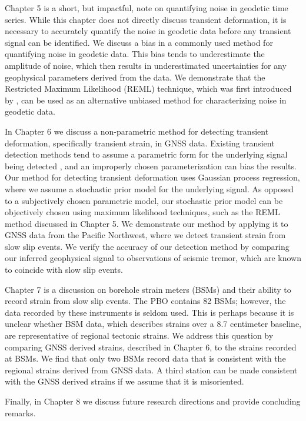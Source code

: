 Chapter 5 is a short, but impactful, note on quantifying noise in geodetic time series.  While this chapter does not directly discuss transient deformation, it is necessary to accurately quantify the noise in geodetic data before any transient signal can be identified. We discuss a bias in a commonly used method for quantifying noise in geodetic data. This bias tends to underestimate the amplitude of noise, which then results in underestimated uncertainties for any geophysical parameters derived from the data. We demonstrate that the Restricted Maximum Likelihood (REML) technique, which was first introduced by \citet{Patterson1971}, can be used as an alternative unbiased method for characterizing noise in geodetic data.

In Chapter 6 we discuss a non-parametric method for detecting transient deformation, specifically transient strain, in GNSS data. Existing transient detection methods tend to assume a parametric form for the underlying signal being detected \citep[e.g.,][]{Ohtani2010}, and an improperly chosen parameterization can bias the results. Our method for detecting transient deformation uses Gaussian process regression, where we assume a stochastic prior model for the underlying signal. As opposed to a subjectively chosen parametric model, our stochastic prior model can be objectively chosen using maximum likelihood techniques, such as the REML method discussed in Chapter 5. We demonstrate our method by applying it to GNSS data from the Pacific Northwest, where we detect transient strain from slow slip events. We verify the accuracy of our detection method by comparing our inferred geophysical signal to observations of seismic tremor, which are known to coincide with slow slip events.       

Chapter 7 is a discussion on borehole strain meters (BSMs) and their ability to record strain from slow slip events. The PBO contains 82 BSMs; however, the data recorded by these instruments is seldom used. This is perhaps because it is unclear whether BSM data, which describes strains over a 8.7 centimeter baseline, are representative of regional tectonic strains. We address this question by comparing GNSS derived strains, described in Chapter 6, to the strains recorded at BSMs. We find that only two BSMs record data that is consistent with the regional strains derived from GNSS data. A third station can be made consistent with the GNSS derived strains if we assume that it is misoriented.

Finally, in Chapter 8 we discuss future research directions and provide concluding remarks.                 